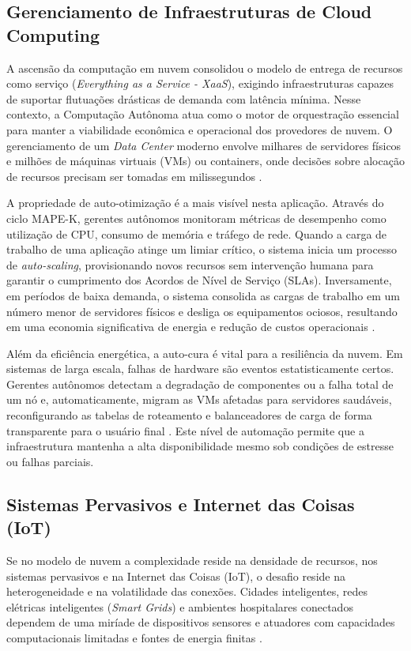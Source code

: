 \subsection{Gerenciamento de Infraestruturas de Cloud Computing}

A ascensão da computação em nuvem consolidou o modelo de entrega de recursos como serviço (\textit{Everything as a Service - XaaS}), exigindo infraestruturas capazes de suportar flutuações drásticas de demanda com latência mínima. Nesse contexto, a Computação Autônoma atua como o motor de orquestração essencial para manter a viabilidade econômica e operacional dos provedores de nuvem. O gerenciamento de um \textit{Data Center} moderno envolve milhares de servidores físicos e milhões de máquinas virtuais (VMs) ou containers, onde decisões sobre alocação de recursos precisam ser tomadas em milissegundos \cite{lalanda2013}.

A propriedade de auto-otimização é a mais visível nesta aplicação. Através do ciclo MAPE-K, gerentes autônomos monitoram métricas de desempenho como utilização de CPU, consumo de memória e tráfego de rede. Quando a carga de trabalho de uma aplicação atinge um limiar crítico, o sistema inicia um processo de \textit{auto-scaling}, provisionando novos recursos sem intervenção humana para garantir o cumprimento dos Acordos de Nível de Serviço (SLAs). Inversamente, em períodos de baixa demanda, o sistema consolida as cargas de trabalho em um número menor de servidores físicos e desliga os equipamentos ociosos, resultando em uma economia significativa de energia e redução de custos operacionais \cite{kephart2003}.

Além da eficiência energética, a auto-cura é vital para a resiliência da nuvem. Em sistemas de larga escala, falhas de hardware são eventos estatisticamente certos. Gerentes autônomos detectam a degradação de componentes ou a falha total de um nó e, automaticamente, migram as VMs afetadas para servidores saudáveis, reconfigurando as tabelas de roteamento e balanceadores de carga de forma transparente para o usuário final \cite{correa2007}. Este nível de automação permite que a infraestrutura mantenha a alta disponibilidade mesmo sob condições de estresse ou falhas parciais.

\subsection{Sistemas Pervasivos e Internet das Coisas (IoT)}

Se no modelo de nuvem a complexidade reside na densidade de recursos, nos sistemas pervasivos e na Internet das Coisas (IoT), o desafio reside na heterogeneidade e na volatilidade das conexões. Cidades inteligentes, redes elétricas inteligentes (\textit{Smart Grids}) e ambientes hospitalares conectados dependem de uma miríade de dispositivos sensores e atuadores com capacidades computacionais limitadas e fontes de energia finitas \cite{sterritt2005}.

